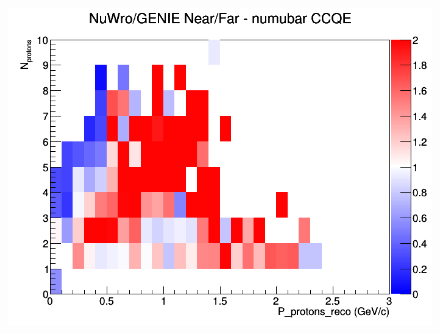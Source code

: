 \begin{figure}[h]
\endminipage
{}
\includegraphics[width=\linewidth]{eff_N_P/GAr/protons/ratios/CCQE_NuWro_GENIE_numubar_NF_N_P.png}
\endminipage
\newline
\end{figure}
\clearpage
